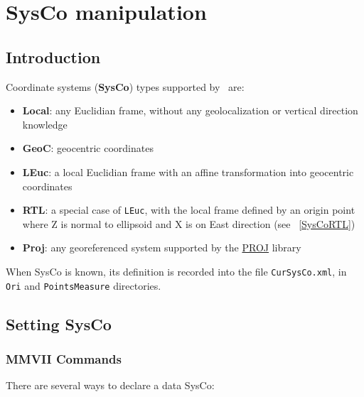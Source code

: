 \chapter{SysCo manipulation}
\label{Chap:SysCo}



\section{Introduction}

Coordinate systems (\textbf{SysCo}) types supported by \CdPPP\ are:
\begin{itemize}
\item \textbf{Local}: any Euclidian frame, without any geolocalization or vertical direction knowledge
\item \textbf{GeoC}: geocentric coordinates
\item \textbf{LEuc}: a local Euclidian frame with an affine transformation into geocentric coordinates
\item \textbf{RTL}: a special case of {\tt LEuc}, with the local frame defined by an origin point where Z is normal to ellipsoid and X is on East direction (see ~\ref{SysCoRTL})
\item \textbf{Proj}: any georeferenced system supported by the \href{https://proj.org}{PROJ} library
\end{itemize}

When SysCo is known, its definition is recorded into the file {\tt CurSysCo.xml}, in {\tt Ori} and {\tt PointsMeasure} directories.


\section{Setting SysCo}

\subsection{MMVII Commands}
There are several ways to declare a data SysCo:

